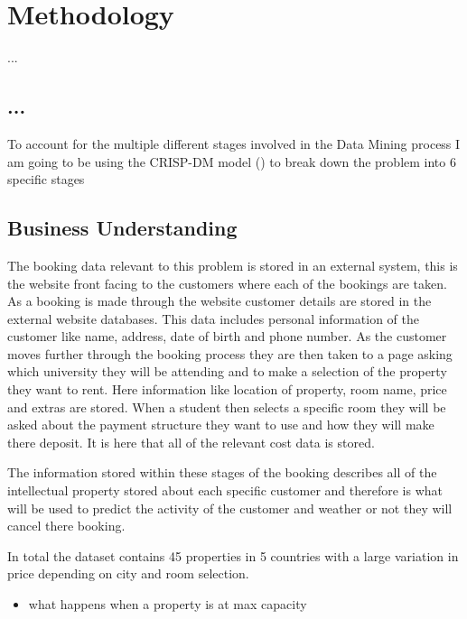 \chapter{Methodology}
\label{ch:method}
...

\section{...}
To account for the multiple different stages involved in the Data Mining process I am going to be using the CRISP-DM model (\cite{WirthCRISP-DM:Mining}) to break down the problem into 6 specific stages


\section{Business Understanding}

The booking data relevant to this problem is stored in an external system, this is the website front facing to the customers where each of the bookings are taken. As a booking is made through the website customer details are stored in the external website databases. This data includes personal information of the customer like name, address, date of birth and phone number. As the customer moves further through the booking process they are then taken to a page asking which university they will be attending and to make a selection of the property they want to rent. Here information like location of property, room name, price and extras are stored. When a student then selects a specific room they will be asked about the payment structure they want to use and how they will make there deposit. It is here that all of the relevant cost data is stored. \par

The information stored within these stages of the booking describes all of the intellectual property stored about each specific customer and therefore is what will be used to predict the activity of the customer and weather or not they will cancel there booking. 

In total the dataset contains 45 properties in 5 countries with a large variation in price depending on city and room selection.

\begin{itemize}
\item what happens when a property is at max capacity
\end{itemize}



